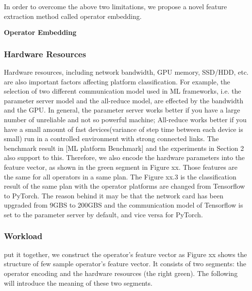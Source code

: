 In order to overcome the above two limitations, we propose a novel feature extraction method called operator embedding.

\textbf{Operator Embedding}


\subsubsection{Hardware Resources}
Hardware resources, including network bandwidth, GPU memory, SSD/HDD, etc. are also important factors affecting platform classification. 
For example, the selection of two different communication model used in ML frameworks, i.e. the parameter server model and the all-reduce model, are effected by the bandwidth and the GPU. 
In general, the parameter server works better if you have a large number of unreliable and not so powerful machine;
All-reduce works better if you have a small amount of fast devices(variance of step time between each device is small) run in a controlled environment with strong connected links. 
The benchmark result in [ML platform Benchmark] and the experiments in Section 2 also support to this. 
Therefore, we also encode the hardware parameters into the feature vector, as shown in the green segment in Figure xx. 
Those features are the same for all operators in a same plan. 
The Figure xx.3 is the classification result of the same plan with the operator platforms are changed from Tensorflow to PyTorch. 
The reason behind it may be that the network card has been upgraded from 9GBS to 200GBS and the communication model of Tensorflow is set to the parameter server by default, and vice versa for PyTorch. 

\subsubsection{Workload}



put it together, we construct the operator's feature vector as 
Figure xx shows the structure of few sample operator's feature vector. 
It consists of two segments: the operator encoding and the hardware resources (the right green). 
The following will introduce the meaning of these two segments.

